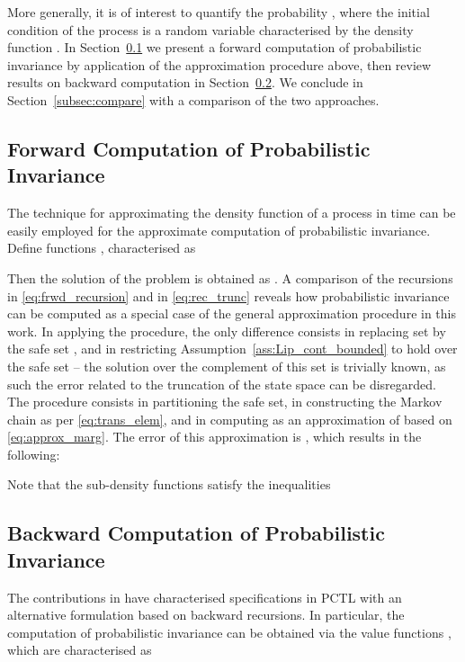 \documentclass{LMCS}
\begin{document}
More generally, it is of interest to quantify the probability , 
where the initial condition of the process  is a random variable characterised by the density function .
In Section~\ref{subsec:safety_forward} we present a forward computation of probabilistic invariance by application of the approximation procedure above,  
then review results on backward computation \cite{APKL10,SA11,SAH12,SA12} in Section~\ref{subsec:safety_backward}. 
We conclude in Section~\ref{subsec:compare} with a comparison of the two approaches. 

\subsection{Forward Computation of Probabilistic Invariance}
\label{subsec:safety_forward}
The technique for approximating the density function of a process in time can be easily employed for the approximate computation of probabilistic invariance.
Define
functions , 
characterised as 

Then the solution of the problem is obtained as .
A comparison of the recursions in \eqref{eq:frwd_recursion} and in \eqref{eq:rec_trunc} reveals how probabilistic invariance can be computed as a special case of the general approximation procedure in this work.
In applying the procedure, 
the only difference consists in replacing set  by the safe set , 
and in restricting Assumption~\ref{ass:Lip_cont_bounded} to hold over the safe set -- the solution over the complement of this set is trivially known, 
as such the error related to the truncation of the state space can be disregarded.  
The procedure consists in partitioning the safe set, 
in constructing the Markov chain  as per \eqref{eq:trans_elem}, 
and in computing  as an approximation of  based on \eqref{eq:approx_marg}. 
The error of this approximation is , which results in the following:

Note that the sub-density functions satisfy the inequalities


\subsection{Backward Computation of Probabilistic Invariance}
\label{subsec:safety_backward}

The contributions in \cite{APKL10,SA11,SAH12,SA12} have characterised specifications in PCTL with an alternative formulation based on backward recursions.  
In particular, the computation of probabilistic invariance can be obtained via the value functions , 
which are characterised as 
\end{document}
